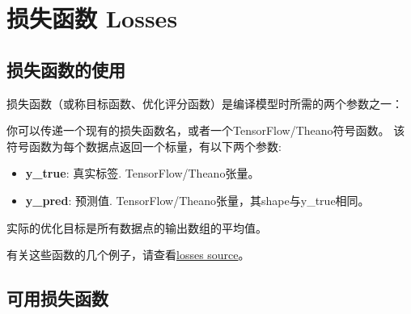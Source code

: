 \section{损失函数 Losses}\label{losses}
    
\subsection{损失函数的使用}

损失函数（或称目标函数、优化评分函数）是编译模型时所需的两个参数之一：

\begin{Shaded}
\begin{Highlighting}[]
\OperatorTok{=}\OperatorTok{=}\NormalTok{)}
\end{Highlighting}
\end{Shaded}

\begin{Shaded}
\begin{Highlighting}[]
  

\OperatorTok{=}\OperatorTok{=}\NormalTok{)}
\end{Highlighting}
\end{Shaded}

你可以传递一个现有的损失函数名，或者一个TensorFlow/Theano符号函数。
该符号函数为每个数据点返回一个标量，有以下两个参数:

\begin{itemize}
\tightlist
\item
  \textbf{y\_true}: 真实标签. TensorFlow/Theano张量。
\item
  \textbf{y\_pred}: 预测值.
  TensorFlow/Theano张量，其shape与y\_true相同。
\end{itemize}

实际的优化目标是所有数据点的输出数组的平均值。

有关这些函数的几个例子，请查看\href{https://github.com/keras-team/keras/blob/master/keras/losses.py}{losses
source}。

\subsection{可用损失函数}\label{ux53efux7528ux635fux5931ux51fdux6570}

